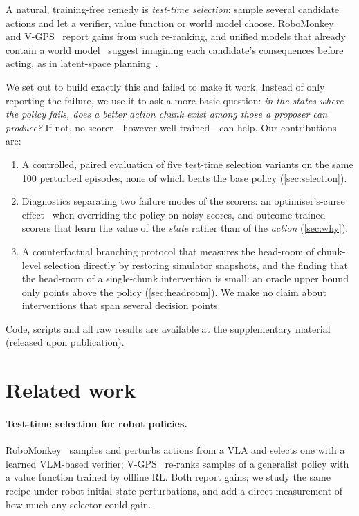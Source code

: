\documentclass{article}
\newcommand{\coderef}{the supplementary material (released upon publication)}
\begin{document}
A natural, training-free remedy is \emph{test-time selection}: sample several candidate actions and let a verifier, value function or world model choose. RoboMonkey~\citep{kwok2025robomonkey} and V-GPS~\citep{nakamoto2024vgps} report gains from such re-ranking, and unified models that already contain a world model~\citep{cen2025worldvla,cen2025rynnvla002} suggest imagining each candidate's consequences before acting, as in latent-space planning~\citep{hafner2018planet,hansen2023tdmpc2,zhou2024dinowm}.

We set out to build exactly this and failed to make it work. Instead of only reporting the failure, we use it to ask a more basic question: \emph{in the states where the policy fails, does a better action chunk exist among those a proposer can produce?} If not, no scorer---however well trained---can help. Our contributions are:
\begin{enumerate}[leftmargin=*,itemsep=2pt]
  \item A controlled, paired evaluation of five test-time selection variants on the same 100 perturbed episodes, none of which beats the base policy (\cref{sec:selection}).
  \item Diagnostics separating two failure modes of the scorers: an optimiser's-curse effect~\citep{smith2006optimizer} when overriding the policy on noisy scores, and outcome-trained scorers that learn the value of the \emph{state} rather than of the \emph{action} (\cref{sec:why}).
  \item A counterfactual branching protocol that measures the head-room of chunk-level selection directly by restoring simulator snapshots, and the finding that the head-room of a single-chunk intervention is small: an oracle upper bound only \oracleGain{} points above the policy (\cref{sec:headroom}). We make no claim about interventions that span several decision points.
\end{enumerate}
Code, scripts and all raw results are available at \coderef.

\section{Related work}
\label{sec:related}

\paragraph{Test-time selection for robot policies.} RoboMonkey~\citep{kwok2025robomonkey} samples and perturbs actions from a VLA and selects one with a learned VLM-based verifier; V-GPS~\citep{nakamoto2024vgps} re-ranks samples of a generalist policy with a value function trained by offline RL. Both report gains; we study the same recipe under robot initial-state perturbations, and add a direct measurement of how much any selector could gain.
\end{document}
